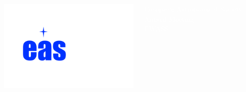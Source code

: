 \documentclass[aspectratio=169]{beamer}
\begin{document}


{
%

\begin{frame}

\begin{columns}[t]
   \vspace{10pt}
   
   \centering
   \includegraphics[width=0.9\columnwidth]{figures/EAS_2020_logo.png}
   
   \Large \textcolor{white}{European Astronomical Society Annual Meeting}\\
   
   \flushleft \normalsize\vspace{-8pt}\textcolor{white}{{\selectfont EWASS}}
   

\end{columns}
\end{frame}}
\end{document}
